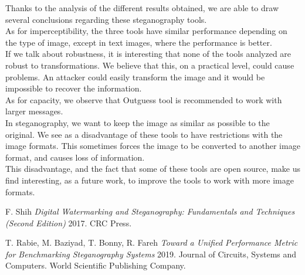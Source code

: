 \documentclass[11pt]{article}
\begin{document}
Thanks to the analysis of the different results obtained, we are able to draw several conclusions regarding these steganography tools.\\
As for imperceptibility, the three tools have similar performance depending on the type of image, except in text images, where the performance is better.\\
If we talk about robustness, it is interesting that none of the tools analyzed are robust to transformations.
We believe that this, on a practical level, could cause problems. An attacker could easily transform the image and it would be impossible to recover the information.\\
As for capacity, we observe that Outguess tool is recommended to work with larger messages.\\
In steganography, we want to keep the image as similar as possible to the original. We see as a disadvantage of these tools to have restrictions with the image formats. This sometimes forces the image to be converted to another image format, and causes loss of information.\\
This disadvantage, and the fact that some of these tools are open source, make us find interesting, as a future work, to improve the tools to work with more image formats.




  \begin{thebibliography}{1}

   F. Shih {\em Digital Watermarking and Steganography: Fundamentals and Techniques
(Second Edition)} 2017. CRC Press.					
  
   T. Rabie, M. Baziyad, T. Bonny, R. Fareh {\em Toward a Unified Performance Metric for Benchmarking
Steganography Systems} 2019. Journal of Circuits, Systems and Computers. World Scientific Publishing Company.

% 
% 

  \end{thebibliography}
\end{document}
